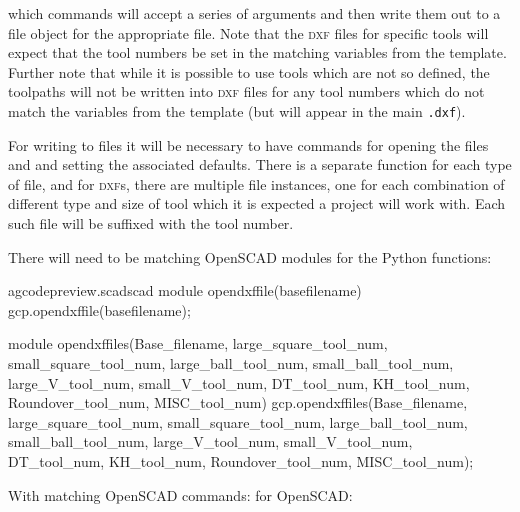 \documentclass{ltxdoc}
\begin{document}
\noindent which commands will accept a series of arguments and then write them out to a file object for the appropriate file. Note that the \textsc{dxf} files for specific tools will expect that the tool numbers be set in the matching variables from the template. Further note that while it is possible to use tools which are not so defined, the toolpaths will not be written into \textsc{dxf} files for any tool numbers which do not match the variables from the template (but will appear in the main \verb|.dxf|).
 
For writing to files it will be necessary to have commands for opening the files  and  and setting the associated defaults. There is a separate function for each type of file, and for \textsc{dxf}s, there are multiple file instances, one for each combination of different type and size of tool which it is expected a project will work with. Each such file will be suffixed with the tool number.

%
There will need to be matching OpenSCAD modules for the Python functions:

\lstset{firstnumber=\thegcpscad}
\begin{writecode}{a}{gcodepreview.scad}{scad}
module opendxffile(basefilename){
    gcp.opendxffile(basefilename);
}

module opendxffiles(Base_filename, large_square_tool_num, small_square_tool_num, large_ball_tool_num, small_ball_tool_num, large_V_tool_num, small_V_tool_num, DT_tool_num, KH_tool_num, Roundover_tool_num, MISC_tool_num) {
    gcp.opendxffiles(Base_filename, large_square_tool_num, small_square_tool_num, large_ball_tool_num, small_ball_tool_num, large_V_tool_num, small_V_tool_num, DT_tool_num, KH_tool_num, Roundover_tool_num, MISC_tool_num);
}

\end{writecode}
\addtocounter{gcpscad}{8}

With matching OpenSCAD commands:  for OpenSCAD:
\end{document}
